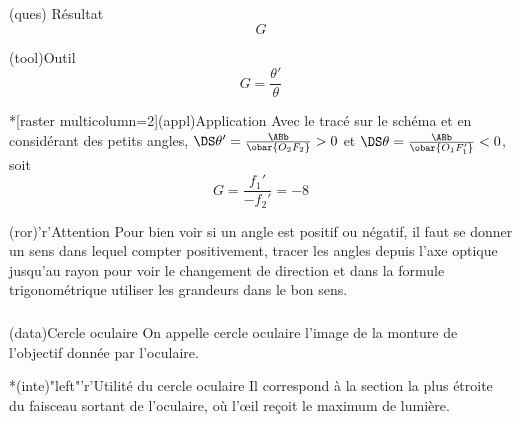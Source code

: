 \documentclass[../../main/main.tex]{subfiles}
\begin{document}
{	\subsubsection{}
	\begin{tcbraster}[raster columns=6, raster equal height=rows]
		\begin{tcolorbox}[blankest, raster multicolumn=1, space to=\myspace]
			\begin{tcbraster}[raster columns=1]
				\begin{tcb}[add to natural height=\myspace, valign=top](ques)
					{Résultat}
					\[
						G
					\]
				\end{tcb}
				\begin{tcb}(tool){Outil}
					\[
						G = \frac{\theta'}{\theta}
					\]
				\end{tcb}
			\end{tcbraster}
		\end{tcolorbox}
		\begin{tcb}*[raster multicolumn=2](appl){Application}
			Avec le tracé sur le schéma et en considérant des petits angles,
			$\DS \theta' = \frac{\ABb}{\obar{O_2F_2}} > 0$ et $\DS \theta =
				\frac{\ABb}{\obar{O_1F_1'}} < 0$, soit \[ G = \frac{f_1'}{-f_2'} = -8\]
		\end{tcb}
		\begin{tcb}[raster multicolumn=3](ror)'r'{Attention}
			Pour bien voir si un angle est positif ou négatif, il faut se donner un
			sens dans lequel compter positivement, tracer les angles depuis l'axe
			optique jusqu'au rayon pour voir le changement de direction et dans la
			formule trigonométrique utiliser les grandeurs dans le bon sens.
		\end{tcb}
	\end{tcbraster}

	\subsubsection{}\label{sssec:k_cercleo}
	\begin{tcbraster}[raster columns=2, raster equal height=rows]
		\begin{tcb}(data){Cercle oculaire}
			On appelle cercle oculaire l'image de la monture de l'objectif donnée par
			l'oculaire.
		\end{tcb}
		\begin{tcb}*(inte)"left"'r'{Utilité du cercle oculaire}
			Il correspond à la section la plus étroite du faisceau sortant de
			l'oculaire, où l'œil reçoit le maximum de lumière.
		\end{tcb}
	\end{tcbraster}

}
\end{document}
